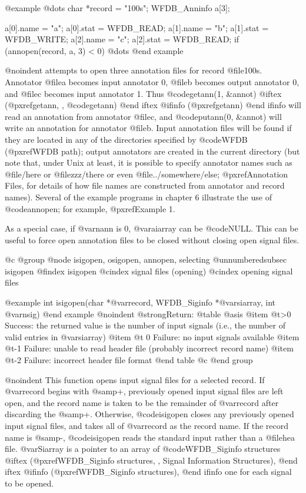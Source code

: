 {{{{{{{{{@example
@dots{}
char *record = "100s";
WFDB_Anninfo a[3];

a[0].name = "a"; a[0].stat = WFDB_READ;
a[1].name = "b"; a[1].stat = WFDB_WRITE;
a[2].name = "c"; a[2].stat = WFDB_READ;
if (annopen(record, a, 3) < 0)
@dots{}
@end example

@noindent
attempts to open three annotation files for record @file{100s}.
Annotator @file{a} becomes input annotator 0, @file{b} becomes output
annotator 0, and @file{c} becomes input annotator 1.  Thus
@code{getann(1, &annot)}
@iftex
(@pxref{getann, , @code{getann}})
@end iftex
@ifinfo
(@pxref{getann})
@end ifinfo
will read an annotation from annotator @file{c}, and
@code{putann(0, &annot)} will write an annotation for annotator @file{b}.
Input annotation files will be found if they are located in any of the
directories specified by @code{WFDB} (@pxref{WFDB path}); output annotators
are created in the current directory (but note that, under Unix at
least, it is possible to specify annotator names such as @file{/here} or
@file{zzz/there} or even @file{../somewhere/else}; @pxref{Annotation
Files}, for details of how file names are constructed from annotator and
record names).  Several of the example programs in chapter 6 illustrate
the use of @code{annopen}; for example, @pxref{Example 1}.

As a special case, if @var{nann} is 0, @var{aiarray} can be @code{NULL}.
This can be useful to force open annotation files to be closed without
closing open signal files.

@c @group
@node     isigopen, osigopen, annopen, selecting
@unnumberedsubsec isigopen
@findex isigopen
@cindex signal files (opening)
@cindex opening signal files

@example
int isigopen(char *@var{record}, WFDB_Siginfo *@var{siarray}, int @var{nsig})
@end example
@noindent
@strong{Return:}
@table @asis
@item @t{>0}
Success: the returned value is the number of input signals (i.e., the
number of valid entries in @var{siarray})
@item @t{ 0}
Failure: no input signals available
@item @t{-1}
Failure: unable to read header file (probably incorrect record name)
@item @t{-2}
Failure: incorrect header file format
@end table
@c @end group

@noindent
This function opens input signal files for a selected record.  If
@var{record} begins with @samp{+}, previously opened input signal files
are left open, and the record name is taken to be the remainder of
@var{record} after discarding the @samp{+}.  Otherwise, @code{isigopen}
closes any previously opened input signal files, and takes all of
@var{record} as the record name.  If the record name is @samp{-},
@code{isigopen} reads the standard input rather than a @file{hea}
file.  @var{Siarray} is a pointer to an array of @code{WFDB_Siginfo}
structures
@iftex
(@pxref{WFDB_Siginfo structures, , Signal Information Structures}),
@end iftex
@ifinfo
(@pxref{WFDB_Siginfo structures}),
@end ifinfo
one for each signal to be opened.

}}}}}}}}}
